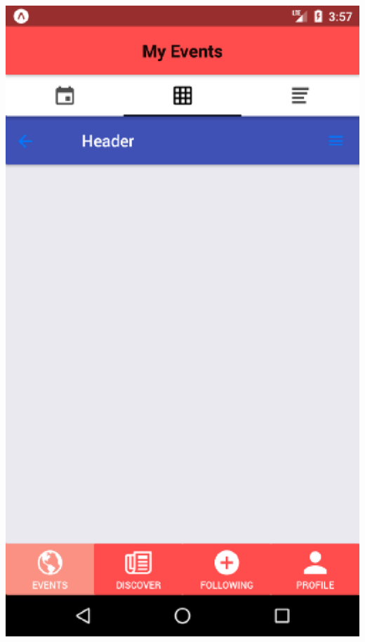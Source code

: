 \documentclass[letterpaper, 10pt,titlepage]{article}
\begin{document}
\includegraphics{Box_View.eps}
\newpage
\end{document}
